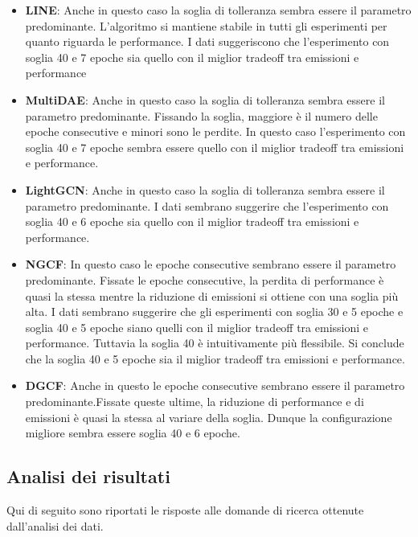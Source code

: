 \begin{itemize}
    \item \textbf{LINE}: Anche in questo caso la soglia di tolleranza sembra essere il parametro predominante. L'algoritmo si mantiene stabile in tutti gli esperimenti per quanto riguarda le performance. I dati suggeriscono che l'esperimento con soglia 40 e 7 epoche sia quello con il miglior tradeoff tra emissioni e performance
    \item \textbf{MultiDAE}: Anche in questo caso la soglia di tolleranza sembra essere il parametro predominante. Fissando la soglia, maggiore è il numero delle epoche consecutive e minori sono le perdite. In questo caso l'esperimento con soglia 40 e 7 epoche sembra essere quello con il miglior tradeoff tra emissioni e performance.
    \item \textbf{LightGCN}: Anche in questo caso la soglia di tolleranza sembra essere il parametro predominante. I dati sembrano suggerire che l'esperimento con soglia 40 e 6 epoche sia quello con il miglior tradeoff tra emissioni e performance.
    \item \textbf{NGCF}: In questo caso le epoche consecutive sembrano essere il parametro predominante. Fissate le epoche consecutive, la perdita di performance è quasi la stessa mentre la riduzione di emissioni si ottiene con una soglia più alta. I dati sembrano suggerire che gli esperimenti con soglia 30 e 5 epoche e soglia 40 e 5 epoche siano quelli con il miglior tradeoff tra emissioni e performance. Tuttavia la soglia 40 è intuitivamente più flessibile. Si conclude che la soglia 40 e 5 epoche sia il miglior tradeoff tra emissioni e performance.
    \item \textbf{DGCF}: Anche in questo le epoche consecutive sembrano essere il parametro predominante.Fissate queste ultime, la riduzione di performance e di emissioni è quasi la stessa al variare della soglia. Dunque la configurazione migliore sembra essere soglia 40 e 6 epoche.
\end{itemize}


\subsection{Analisi dei risultati}

Qui di seguito sono riportati le risposte alle domande di ricerca ottenute dall'analisi dei dati.
